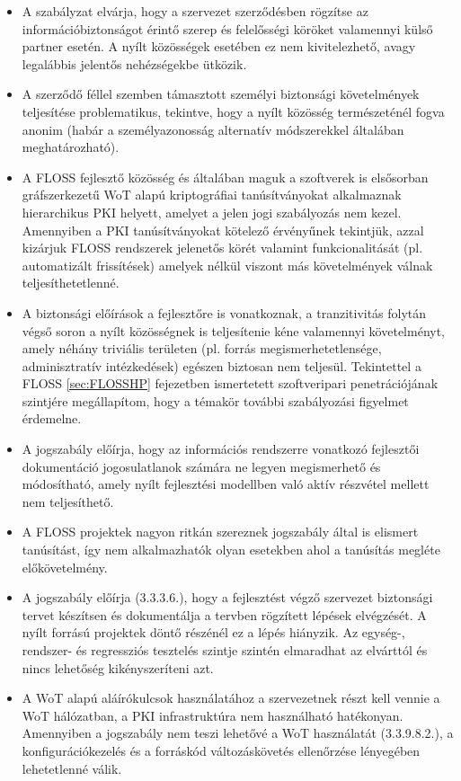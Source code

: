 \documentclass[12pt,magyar,a4paper,oneside]{scrreprt}
\begin{document}
\begin{itemize}
\item
  A szabályzat elvárja, hogy a szervezet szerződésben rögzítse az
  információbiztonságot érintő szerep és felelősségi köröket valamennyi
  külső partner esetén. A nyílt közösségek esetében ez nem
  kivitelezhető, avagy legalábbis jelentős nehézségekbe ütközik.
\item
  A szerződő féllel szemben támasztott személyi biztonsági követelmények
  teljesítése problematikus, tekintve, hogy a nyílt közösség
  természeténél fogva anonim (habár a személyazonosság alternatív
  módszerekkel általában meghatározható).
\item
  A FLOSS fejlesztő közösség és általában maguk a szoftverek is
  elsősorban gráfszerkezetű WoT alapú kriptográfiai tanúsítványokat
  alkalmaznak hierarchikus PKI helyett, amelyet a jelen jogi szabályozás
  nem kezel. Amennyiben a PKI tanúsítványokat kötelező érvényűnek
  tekintjük, azzal kizárjuk FLOSS rendszerek jelenetős körét valamint
  funkcionalitását (pl. automatizált frissítések) amelyek nélkül viszont
  más követelmények válnak teljesíthetetlenné.
\item
  A biztonsági előírások a fejlesztőre is vonatkoznak, a tranzitivitás
  folytán végső soron a nyílt közösségnek is teljesítenie kéne
  valamennyi követelményt, amely néhány triviális területen (pl. forrás
  megismerhetetlensége, adminisztratív intézkedések) egészen biztosan
  nem teljesül. Tekintettel a FLOSS \ref{sec:FLOSSHP} fejezetben
  ismertetett szoftveripari penetrációjának szintjére megállapítom, hogy
  a témakör további szabályozási figyelmet érdemelne.
\item
  A jogszabály előírja, hogy az információs rendszerre vonatkozó
  fejlesztői dokumentáció jogosulatlanok számára ne legyen megismerhető
  és módosítható, amely nyílt fejlesztési modellben való aktív részvétel
  mellett nem teljesíthető.
\item
  A FLOSS projektek nagyon ritkán szereznek jogszabály által is elismert
  tanúsítást, így nem alkalmazhatók olyan esetekben ahol a tanúsítás
  megléte előkövetelmény.
\item
  A jogszabály előírja (3.3.3.6.), hogy a fejlesztést végző szervezet
  biztonsági tervet készítsen és dokumentálja a tervben rögzített
  lépések elvégzését. A nyílt forrású projektek döntő részénél ez a
  lépés hiányzik. Az egység-, rendszer- és regressziós tesztelés szintje
  szintén elmaradhat az elvárttól és nincs lehetőség kikényszeríteni
  azt.
\item
  A WoT alapú aláírókulcsok használatához a szervezetnek részt kell
  vennie a WoT hálózatban, a PKI infrastruktúra nem használható
  hatékonyan. Amennyiben a jogszabály nem teszi lehetővé a WoT
  használatát (3.3.9.8.2.), a konfigurációkezelés és a forráskód
  változáskövetés ellenőrzése lényegében lehetetlenné válik.
\end{itemize}
\end{document}
